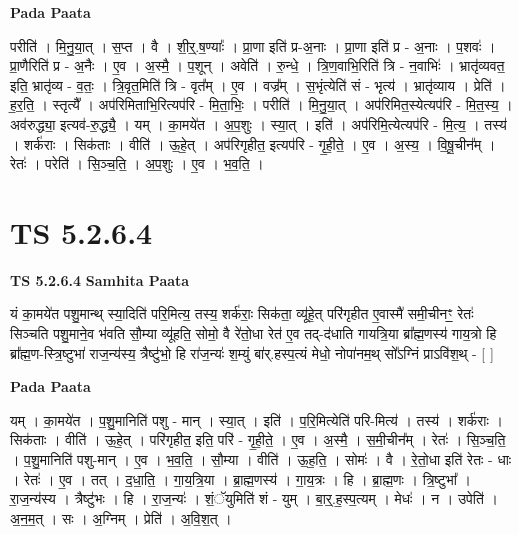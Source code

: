 \documentclass[17pt]{extarticle}
\begin{document}
\textbf{Pada Paata} \newline

परीति॑ । मि॒नु॒या॒त् । स॒प्त । वै । शी॒र्॒.ष॒ण्याः᳚ । प्रा॒णा इति॑ प्र-अ॒नाः । प्रा॒णा इति॑ प्र - अ॒नाः । प॒शवः॑ । प्रा॒णैरिति॑ प्र - अ॒नैः । ए॒व । अ॒स्मै॒ । प॒शून् । अवेति॑ । रु॒न्धे॒ । त्रि॒ण॒वाभि॒रिति॑ त्रि - न॒वाभिः॑ । भ्रातृ॑व्यवत॒ इति॒ भ्रातृ॑व्य - व॒तः॒ । त्रि॒वृत॒मिति॑ त्रि - वृत᳚म् । ए॒व । वज्र᳚म् । स॒भृंत्येति॑ सं - भृत्य॑ । भ्रातृ॑व्याय । प्रेति॑ । ह॒र॒ति॒ । स्तृत्यै᳚ । अप॑रिमिताभि॒रित्यप॑रि - मि॒ता॒भिः॒ । परीति॑ । मि॒नु॒या॒त् । अप॑रिमित॒स्येत्यप॑रि - मि॒त॒स्य॒ । अव॑रुद्ध्या॒ इत्यव॑-रु॒द्ध्यै॒ । यम् । का॒मये॑त । अ॒प॒शुः । स्या॒त् । इति॑ । अप॑रिमि॒त्येत्यप॑रि - मि॒त्य॒ । तस्य॑ । शर्क॑राः । सिक॑ताः । वीति॑ । ऊ॒हे॒त् । अप॑रिगृहीत॒ इत्यप॑रि - गृ॒ही॒ते॒ । ए॒व । अ॒स्य॒ । वि॒षू॒चीन᳚म् । रेतः॑ । परेति॑ । सि॒ञ्च॒ति॒ । अ॒प॒शुः । ए॒व । भ॒व॒ति॒ ।  \newline





\section{ TS 5.2.6.4 }

\textbf{TS 5.2.6.4 } \newline
\textbf{Samhita Paata} \newline

यं का॒मये॑त पशु॒मान्थ् स्या॒दिति॑ परि॒मित्य॒ तस्य॒ शर्क॑राः॒ सिक॑ता॒ व्यू॑हे॒त् परि॑गृहीत ए॒वास्मै॑ समी॒चीनꣳ॒॒ रेतः॑ सिञ्चति पशु॒माने॒व भ॑वति सौ॒म्या व्यू॑हति॒ सोमो॒ वै रे॑तो॒धा रेत॑ ए॒व तद्-द॑धाति गायत्रि॒या ब्रा᳚ह्म॒णस्य॑ गाय॒त्रो हि ब्रा᳚ह्म॒ण-स्त्रि॒ष्टुभा॑ राज॒न्य॑स्य॒ त्रैष्टु॑भो॒ हि रा॑ज॒न्यः॑ श॒म्युं बा॑र्.हस्प॒त्यं मेधो॒ नोपा॑नम॒थ् सो᳚ऽग्निं प्राऽवि॑श॒थ् - [  ] \newline

\textbf{Pada Paata} \newline

यम् । का॒मये॑त । प॒शु॒मानिति॑ पशु - मान् । स्या॒त् । इति॑ । प॒रि॒मित्येति॑ परि-मित्य॑ । तस्य॑ । शर्क॑राः । सिक॑ताः । वीति॑ । ऊ॒हे॒त् । परि॑गृहीत॒ इति॒ परि॑ - गृ॒ही॒ते॒ । ए॒व । अ॒स्मै॒ । स॒मी॒चीन᳚म् । रेतः॑ । सि॒ञ्च॒ति॒ । प॒शु॒मानिति॑ पशु-मान् । ए॒व । भ॒व॒ति॒ । सौ॒म्या । वीति॑ । ऊ॒ह॒ति॒ । सोमः॑ । वै । रे॒तो॒धा इति॑ रेतः - धाः । रेतः॑ । ए॒व । तत् । द॒धा॒ति॒ । गा॒य॒त्रि॒या । ब्रा॒ह्म॒णस्य॑ । गा॒य॒त्रः । हि । ब्रा॒ह्म॒णः । त्रि॒ष्टुभा᳚ । रा॒ज॒न्य॑स्य । त्रैष्टु॑भः । हि । रा॒ज॒न्यः॑ । शं॒ॅयुमिति॑ शं - युम् । बा॒र्॒.ह॒स्प॒त्यम् । मेधः॑ । न । उपेति॑ । अ॒न॒म॒त् । सः । अ॒ग्निम् । प्रेति॑ । अ॒वि॒श॒त् ।  \newline
\end{document}
